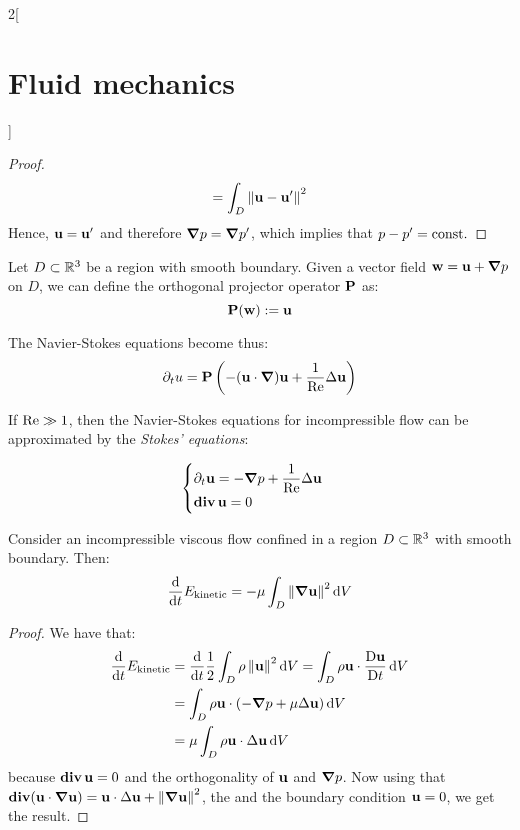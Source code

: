 \documentclass[../../../main_physics.tex]{subfiles}
\begin{document}
\begin{multicols}{2}[\section{Fluid mechanics}]
\begin{proof}
\begin{multline*}
      =\int_D\left\|\boldsymbol{\mathrm{u}}-\boldsymbol{\mathrm{u}}'\right\|^2
    \end{multline*}
    Hence, $\boldsymbol{\mathrm{u}}=\boldsymbol{\mathrm{u}}'$ and therefore $\grad p=\grad p'$, which implies that $p-p'=\text{const.}$
  \end{proof}
  \begin{definition}
    Let $D\subset\mathbb{R}^3$ be a region with smooth boundary. Given a vector field $\boldsymbol{\mathrm{w}}=\boldsymbol{\mathrm{u}}+\grad p$ on $D$, we can define the orthogonal projector operator $\boldsymbol{\mathrm{P}}$ as:
    $$
      \boldsymbol{\mathrm{P}}(\boldsymbol{\mathrm{w}}):=\boldsymbol{\mathrm{u}}
    $$
  \end{definition}
  \begin{remark}
    The Navier-Stokes equations become thus:
    $$
      \partial_t u=\boldsymbol{\mathrm{P}}\left( -(\boldsymbol{\mathrm{u}} \cdot \grad) \boldsymbol{\mathrm{u}}+\frac{1}{\mathrm{Re}} \Delta \boldsymbol{\mathrm{u}} \right)
    $$
  \end{remark}
  \begin{remark}
    If $\mathrm{Re}\gg 1$, then the Navier-Stokes equations for incompressible flow can be approximated by the \emph{Stokes' equations}:
    \begin{important}
      $$
        \begin{cases}
          \displaystyle\partial_t\boldsymbol{\mathrm{u}}=-\grad p + \frac{1}{\mathrm{Re}}\Delta\boldsymbol{\mathrm{u}} \\
          \displaystyle\operatorname{\boldsymbol{\mathrm{div}}}\boldsymbol{\mathrm{u}}=0
        \end{cases}
      $$
    \end{important}
  \end{remark}
  \begin{proposition}
    Consider an incompressible viscous flow confined in a region $D\subset\mathbb{R}^3$ with smooth boundary. Then:
    $$
      \dv{}{t}E_\text{kinetic}=-\mu \int_D \left\|\grad \boldsymbol{\mathrm{u}}\right\|^2\dd{V}
    $$
  \end{proposition}
  \begin{proof}
    We have that:
    \begin{align*}
      \dv{}{t}E_\text{kinetic} & =\dv{}{t}\frac{1}{2}\int_D \rho \left\|\boldsymbol{\mathrm{u}}\right\|^2\dd{V}=\int_D \rho \boldsymbol{\mathrm{u}}\cdot \frac{\mathrm{D}\boldsymbol{\mathrm{u}}}{\mathrm{D}t}\dd{V} \\
                               & =\int_D \rho \boldsymbol{\mathrm{u}}\cdot \left(-\grad p + \mu\Delta\boldsymbol{\mathrm{u}}\right)\dd{V}                            \\
                               & =\mu\int_D \rho \boldsymbol{\mathrm{u}}\cdot \Delta\boldsymbol{\mathrm{u}}\dd{V}
    \end{align*}
    because $\operatorname{\boldsymbol{\mathrm{div}}} \boldsymbol{\mathrm{u}}=0$ and the orthogonality of $\boldsymbol{\mathrm{u}}$ and $\grad p$. Now using that $\operatorname{\boldsymbol{\mathrm{div}}}(\boldsymbol{\mathrm{u}} \cdot \grad \boldsymbol{\mathrm{u}})=\boldsymbol{\mathrm{u}}\cdot \Delta\boldsymbol{\mathrm{u}}+\left\|\grad \boldsymbol{\mathrm{u}}\right\|^2$, the  and the boundary condition $\boldsymbol{\mathrm{u}}=0$, we get the result.

\end{proof}
\end{multicols}
\end{document}
